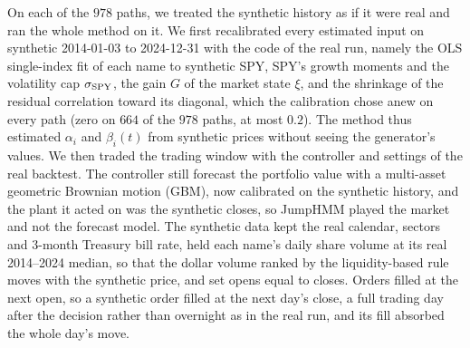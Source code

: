 On each of the $978$ paths, we treated the synthetic history as if it were real and ran the whole method on it. We
first recalibrated every estimated input on synthetic 2014-01-03 to 2024-12-31 with the code of the real run, namely
the OLS single-index fit of each name to synthetic SPY, SPY's growth moments and the volatility cap
$\sigma_{\rm SPY}$, the gain $G$ of the market state $\xi$, and the shrinkage of the residual correlation toward its
diagonal, which the calibration chose anew on every path (zero on $664$ of the $978$ paths, at most $0.2$). The method
thus estimated $\alpha_i$ and $\beta_i(t)$ from synthetic prices without seeing the generator's values. We then traded
the trading window with the controller and settings of the real backtest. The controller still forecast the
portfolio value with a multi-asset geometric Brownian motion (GBM), now calibrated on the synthetic history, and the
plant it acted on was the synthetic closes, so JumpHMM played the market and not the forecast model. The synthetic
data kept the real calendar, sectors and 3-month Treasury bill rate, held each name's daily share volume at its real
2014--2024 median, so that the dollar volume ranked by the liquidity-based rule moves with the synthetic price, and
set opens equal to closes.
Orders filled at the next open, so a synthetic order filled at the next day's close, a full trading day after the
decision rather than overnight as in the real run, and its fill absorbed the whole day's move.

